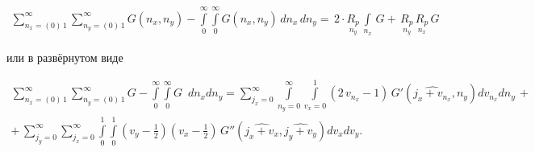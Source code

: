 \documentclass[twoside, 10pt]{article}
\begin{document}
    \begin{equation}
\begin{array}{r}
\sum\limits_{n_x=\left(0\right)\,1}^{\infty}
\sum\limits_{n_y=\left(0\right)\,1}^{\infty}
G\left(n_x, n_y\right)
-
\int\limits_{0}^{\infty}
\int\limits_{0}^{\infty}
G\left(n_x, n_y\right)\,d{n_x}\,d{n_y} =
\,2\cdot\underset{n_y}{R_{p}}\,\int\limits_{n_x}^{}\,G 
+\,\underset{n_y}{R_{p}}\,\underset{n_x}{R_{p}}\,G
\end{array}
\end{equation}

    или в развёрнутом виде

\noindent
\begin{equation}
\begin{array}{r}
\sum\limits_{n_x=\left(0\right)\,1}^{\infty}
\sum\limits_{n_y=\left(0\right)\,1}^{\infty}
G%
-
\int\limits_{0}^{\infty}
\int\limits_{0}^{\infty}
G%
\,\,\, d{n_x} d{n_y}  =
{\sum\limits_{j_{x}=0}^{\infty} \int\limits_{n_{y}=0}^{\infty} \int\limits_{v_x=0}^{1}  {\left(2 \, v_{n_{x}} - 1\right)}\, G'\left(\widehat{j_{x} + v_{n_{x}}}, n_{y}\right) {d v_{n_{x}}} {d n_{y}}} \, + \\
 + \,\sum\limits_{j_{y}=0}^{\infty} \sum\limits_{j_{x}=0}^{\infty} \int\limits_{0}^{1} \int\limits_{0}^{1} {\left(v_{y} - \frac{1}{2}\right)} {\left(v_{x} - \frac{1}{2}\right)} \, G''\left(\widehat{j_{x} + v_{x}}, \widehat{j_{y} + v_{y}}\right){d v_{x}}{d v_{y}}.
\end{array}
\end{equation}
\end{document}

